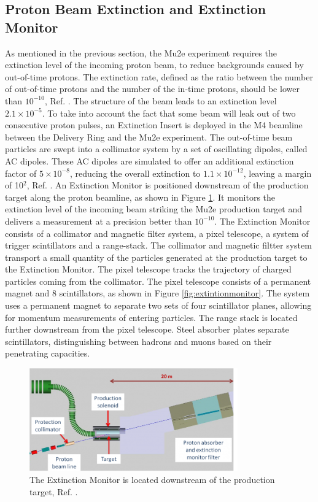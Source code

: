 \subsection{Proton Beam Extinction and Extinction Monitor}
As mentioned in the previous section, the Mu2e experiment requires the extinction level of the incoming proton beam, to reduce backgrounds caused by out-of-time protons. 
The extinction rate, defined as the ratio between the number of out-of-time protons and the number of the in-time protons, should be lower than $10^{-10}$, 
Ref. \cite{bartoszek2015mu2e}. The structure of the beam leads to an extinction level $2.1 \times 10^{-5}$. To take into account the fact that some beam will 
leak out of two consecutive proton pulses, an Extinction Insert is deployed in the M4 beamline between the Delivery Ring and the Mu2e experiment. The out-of-time 
beam particles are swept into a collimator system by a set of oscillating dipoles, called AC dipoles. These AC dipoles are simulated to offer an additional 
extinction factor of $5\times 10^{-8}$, reducing the overall extinction to $1.1 \times 10^{-12}$, leaving a margin of 10$^2$, Ref. \cite{accelerator}. An 
Extinction Monitor is positioned downstream of the production target along the proton beamline, as shown in Figure \ref{fig:extintion}. It monitors the 
extinction level of the incoming beam striking the Mu2e production target and delivers a measurement at a precision better than $10^{-10}$. The Extinction 
Monitor consists of a collimator and magnetic filter system, a pixel telescope, a system of trigger scintillators and a range-stack. The collimator and 
magnetic filtter system transport a small quantity of the particles generated at the production target to the Extinction Monitor. The pixel telescope 
tracks the trajectory of charged particles coming from the collimator. The pixel telescope consists of a permanent magnet and 8 scintillators, as shown 
in Figure \ref{fig:extintionmonitor}. The system uses a permanent magnet to separate two sets of four scintillator planes, allowing for momentum measurements 
of entering particles. The range stack is located further downstream from the pixel telescope. Steel absorber plates separate scintillators, distinguishing 
between hadrons and muons based on their penetrating capacities.
\begin{figure}[!h]
\centering
\includegraphics[width =0.8\textwidth]{figures/png/800px-Extinction_filter.png}
\caption{The Extinction Monitor is located downstream of the
production target, Ref. \cite{Prebys:IPAC2015-THPF121}.}
\label{fig:extintion}
\end{figure}
